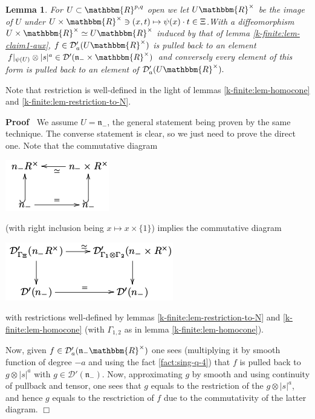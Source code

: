 \documentclass{article}
\newenvironment{proof}{\noindent\textbf{Proof\ }}{\hspace*{\fill}$\Box$\medskip}
\numberwithin{definition}{section}
\newtheorem{lemma}{Lemma}
\numberwithin{lemma}{section}
\numberwithin{proposition}{section}
{\theorembodyfont{\rmfamily}\newtheorem{remark}{Remark}
\numberwithin{remark}{section}
}
\begin{document}
\begin{lemma}
  \label{k-finite:lem-claim1-aux-2} For $U \subset \mathbbm{R}^{p, q}$ open we
  let $U\mathbbm{R}^{\times}$ be the image of $U$ under $U \times
  \mathbbm{R}^{\times} \ni ( x, t) \mapsto \psi ( x) \cdot t \in \Xi$.With a
  diffeomorphism $U \times \mathbbm{R}^{\times} \simeq U\mathbbm{R}^{\times}$
  induced by that of lemma \ref{k-finite:lem-claim1-aux}, $f \in
  \mathcal{D}'_a ( U\mathbbm{R}^{\times})$ is pulled back to an element $f
  |_{\psi ( U)} \otimes | s |^a \in \mathcal{D}' ( \mathfrak{n}_- \times
  \mathbbm{R}^{\times})$ and conversely every element of this form is pulled
  back to an element of $\mathcal{D}'_a ( U\mathbbm{R}^{\times}) .$
\end{lemma}

\begin{remark}
  Note that restriction is well-defined in the light of lemmas
  \ref{k-finite:lem-homocone} and \ref{k-finite:lem-restriction-to-N}.
\end{remark}

\begin{proof}
  We assume $U =\mathfrak{n}_-$, the general statement being proven by the
  same technique. The converse statement is clear, so we just need to prove
  the direct one. Note that the commutative diagram
  
  \begin{center}
    \includegraphics[scale=0.6]{master_master-3.png}
  \end{center}
  
  (with right inclusion being $x \mapsto x \times \{ 1 \}$) implies the
  commutative diagram
  
  \begin{center}
    \includegraphics[scale=0.6]{master_master-4.png}
  \end{center}
  
  with restrictions well-defined by lemmas \ref{k-finite:lem-restriction-to-N}
  and \ref{k-finite:lem-homocone} (with $\Gamma_{1, 2}$ as in lemma
  \ref{k-finite:lem-homocone}).
  
  Now, given $f \in \mathcal{D}'_a ( \mathfrak{n}_- \mathbbm{R}^{\times})$ one
  sees (multiplying it by smooth function of degree $- a$ and using the fact
  \ref{fact:sing-q-4}) that $f$ is pulled back to $g \otimes | s |^a$ with $g
  \in \mathcal{D}' ( \mathfrak{n}_-)$. Now, approximating $g$ by smooth and
  using continuity of pullback and tensor, one sees that $g$ equals to the
  restriction of the $g \otimes | s |^a$, and hence $g$ equals to the
  resctriction of $f$ due to the commutativity of the latter diagram.
\end{proof}
\end{document}
